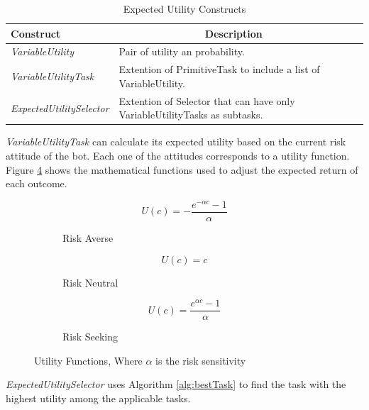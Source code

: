 \begin{table}[h]
    \centering
    \begin{tabular}{|l|l|l|}
        \hline
        \textbf{Construct}               & \multicolumn{1}{c|}{\textbf{Description}}                                                       \\ \hline
        \textit{VariableUtility}         & Pair of utility an probability.                                                                \\ \hline
        \textit{VariableUtilityTask}     & Extention of PrimitiveTask to include a list of VariableUtility.                                \\ \hline
        \textit{ExpectedUtilitySelector} & Extention of Selector that can have only VariableUtilityTasks as subtasks. \\ \hline
    \end{tabular}
    \caption{Expected Utility Constructs}
\end{table}

\textit{VariableUtilityTask} can calculate its expected utility based on the current risk attitude of the bot. Each one of the attitudes corresponds to a utility function. Figure \ref{fig:utilityfunctions} shows the mathematical functions used to adjust the expected return of each outcome.

\begin{figure}[h]
    \centering
    \begin{subfigure}[b]{0.33\textwidth}
        \centering
        $$U(c)= - \frac{e^{-\alpha c} -1}{\alpha}$$
        \caption{Risk Averse}
        \label{fig:riskaverse}
    \end{subfigure}
    \begin{subfigure}[b]{0.33\textwidth}
        \centering
        $$U(c)= c$$
        \caption{Risk Neutral}
        \label{fig:riskneutral}
    \end{subfigure}
    \begin{subfigure}[b]{0.33\textwidth}
        \centering
        $$U(c)= \frac{e^{\alpha c} -1}{\alpha}$$
        \caption{Risk Seeking}
        \label{fig:riskseeking}
    \end{subfigure}
    \caption{Utility Functions, Where $\alpha$ is the risk sensitivity}
    \label{fig:utilityfunctions}
\end{figure}

\textit{ExpectedUtilitySelector} uses Algorithm \ref{alg:bestTask} to find the task with the highest utility among the applicable tasks.



